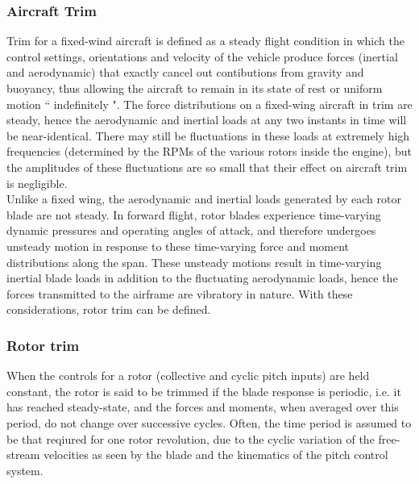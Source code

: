 \subsubsection{Aircraft Trim}
Trim for a fixed-wind aircraft is defined as a steady flight condition in which the control settings, orientations and velocity of the vehicle produce forces (inertial and aerodynamic) that exactly cancel out contibutions from gravity and buoyancy, thus allowing the aircraft to remain in its state of rest or uniform motion `` indefinitely ". The force distributions on a fixed-wing aircraft in trim are steady, hence the aerodynamic and inertial loads at any two instants in time will be near-identical. There may still be fluctuations in these loads at extremely high frequencies (determined by the RPMs of the various rotors inside the engine), but the amplitudes of these fluctuations are so small that their effect on aircraft trim is negligible.\\
Unlike a fixed wing, the aerodynamic and inertial loads generated by each rotor blade are not steady. In forward flight, rotor blades experience time-varying dynamic pressures and operating angles of attack, and therefore undergoes unsteady motion in response to these time-varying force and moment distributions along the span. These unsteady motions result in time-varying inertial blade loads in addition to the fluctuating aerodynamic loads, hence the forces transmitted to the airframe are vibratory in nature. With these considerations, rotor trim can be defined. 

\subsubsection{Rotor trim}
When the controls for a rotor (collective and cyclic pitch inputs) are held constant, the rotor is said to be trimmed if the blade response is periodic, i.e. it has reached steady-state, and the forces and moments, when averaged over this period, do not change over successive cycles. Often, the time period is assumed to be that reqiured for one rotor revolution, due to the cyclic variation of the free-stream velocities as seen by the blade and the kinematics of the pitch control system.

